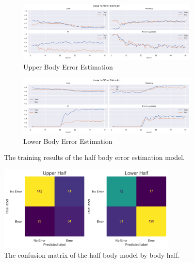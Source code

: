 \begin{figure}[ht]
  \centering
  \begin{subfigure}[b]{0.8\textwidth}
      \centering
      \includegraphics[width=\textwidth]{figures/Results/v1/hb/UpperBody_ErrorEstimation.png}
      \caption{Upper Body Error Estimation}
      \label{fig:uh_ee}
  \end{subfigure}
  \hfill
  \begin{subfigure}[b]{0.8\textwidth}
      \centering
      \includegraphics[width=\textwidth]{figures/Results/v1/hb/LowerBody_ErrorEstimation.png}
      \caption{Lower Body Error Estimation}
      \label{fig:lh_ee}
  \end{subfigure}
  \caption[Half Body model training results]{The training results of the half body error estimation model.}
     \label{fig:half_body_training_results}
\end{figure}

\begin{figure}[ht]
  \centering
  \includegraphics[width=0.8\textwidth]{figures/Results/v1/confusion/body_halves_half.png}
  \caption[half Body Confusion Matrix by Body Half]{The confusion matrix of the half body model by body half.}
  \label{fig:conf_v1_hb}
\end{figure}

